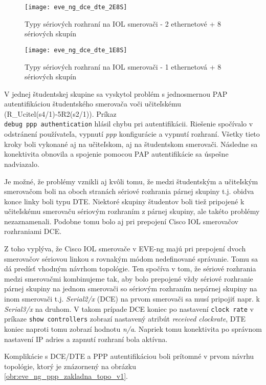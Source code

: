 \begin{figure}
    \centering
    \texttt{[image: eve\_ng\_dce\_dte\_2E8S]}
    \caption{Typy sériových rozhraní na IOL smerovači - 2 ethernetové + 8 sériových skupín}
    \label{obr:eve_ng_dce_dte_2E8S}

    \vspace{1cm}

    \centering
    \texttt{[image: eve\_ng\_dce\_dte\_1E8S]}
    \caption{Typy sériových rozhraní na IOL smerovači - 1 ethernetová + 8 sériových skupín}
    \label{obr:eve_ng_dce_dte_1E8S}
\end{figure}

V jednej študentskej skupine sa vyskytol problém s jednosmernou PAP autentifikáciou študentského smerovača voči učiteľskému (R\_Ucitel(s4/1)-5R2(s2/1)). Príkaz \\\texttt{debug ppp authentication} hlásil chybu pri autentifikácii. Riešenie spočívalo v odstránení používateľa, vypnutí \emph{ppp} konfigurácie a vypnutí rozhraní. Všetky tieto kroky boli vykonané aj na učiteľskom, aj na študentskom smerovači. Následne sa konektivita obnovila a spojenie pomocou PAP autentifikácie sa úspešne nadviazalo.

Je možné, že problémy vznikli aj kvôli tomu, že medzi študentským a učiteľským smerovačom boli na oboch stranách sériové rozhrania párnej skupiny t.j. obidva konce linky boli typu DTE. Niektoré skupiny študentov boli tiež pripojené k učiteľskému smerovaču sériovým rozhraním z párnej skupiny, ale takéto problémy nezaznamenali. Podobne tomu bolo aj pri prepojení Cisco IOL smerovačov rozhraniami DCE.

Z toho vyplýva, že Cisco IOL smerovače v EVE-ng majú pri prepojení dvoch smerovačov sériovou linkou s rovnakým módom nedefinované správanie. Tomu sa dá predísť vhodným návrhom topológie. Ten spočíva v tom, že sériové rozhrania medzi smerovačmi kombinujeme tak, aby bolo prepojené vždy sériové rozhranie párnej skupiny na jednom smerovači so sériovým rozhraním nepárnej skupiny na inom smerovači t.j. \emph{Serial2/x} (DCE) na prvom smerovači sa musí pripojiť napr. k \emph{Serial3/x} na druhom. V takom prípade DCE koniec po nastavení \texttt{clock rate} v príkaze \texttt{show controllers} zobrazí nastavený atribút \emph{received clockrate}, DTE koniec naproti tomu zobrazí hodnotu \emph{n/a}. Napriek tomu konektivita po správnom nastavení IP adries a zapnutí rozhraní bola aktívna.

Komplikácie s DCE/DTE a PPP autentifikáciou boli prítomné v prvom návrhu topológie, ktorý je znázornený na obrázku \ref{obr:eve_ng_ppp_zakladna_topo_v1}.

